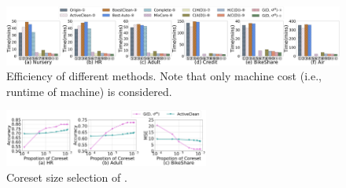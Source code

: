 

\begin{figure}
	\centering
	\includegraphics[width=\textwidth]{figs/efficiency_new.png}
	\caption{Efficiency of different methods. Note that only machine cost (i.e., runtime of machine) is considered.}
	\label{fig:efficiency}
\end{figure}





\begin{figure}
	\vspace{-1em}
	\centering
	\includegraphics[width=0.6\textwidth]{figs/e2e}
	\caption{ Coreset size selection of \ours.}
	\label{fig:e2e}
\end{figure}





